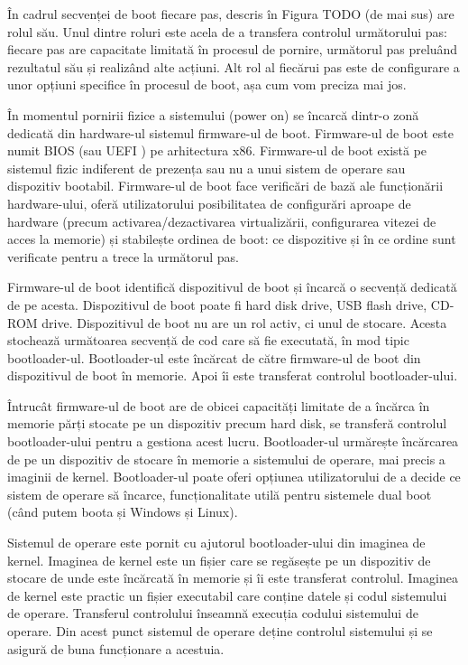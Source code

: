 În cadrul secvenței de boot fiecare pas, descris în Figura TODO (de mai sus) are
rolul său. Unul dintre roluri este acela de a transfera controlul următorului
pas: fiecare pas are capacitate limitată în procesul de pornire, următorul pas
preluând rezultatul său și realizând alte acțiuni. Alt rol al fiecărui pas este
de configurare a unor opțiuni specifice în procesul de boot, așa cum vom preciza
mai jos.

În momentul pornirii fizice a sistemului (power on) se încarcă dintr-o zonă
dedicată din hardware-ul sistemul firmware-ul de boot. Firmware-ul de boot este
numit BIOS (sau UEFI ) pe
arhitectura x86. Firmware-ul de boot există pe sistemul fizic indiferent de
prezența sau nu a unui sistem de operare sau dispozitiv bootabil. Firmware-ul de
boot face verificări de bază ale funcționării hardware-ului, oferă
utilizatorului posibilitatea de configurări aproape de hardware (precum
activarea/dezactivarea virtualizării, configurarea vitezei de acces la memorie)
și stabilește ordinea de boot: ce dispozitive și în ce ordine sunt verificate
pentru a trece la următorul pas.

Firmware-ul de boot identifică dispozitivul de boot și încarcă o secvență
dedicată de pe acesta. Dispozitivul de boot poate fi hard disk drive, USB flash
drive, CD-ROM drive. Dispozitivul de boot nu are un rol activ, ci unul de
stocare. Acesta stochează următoarea secvență de cod care să fie executată, în
mod tipic bootloader-ul. Bootloader-ul este încărcat de către firmware-ul de
boot din dispozitivul de boot în memorie. Apoi îi este transferat controlul
bootloader-ului.

Întrucât firmware-ul de boot are de obicei capacități limitate de a încărca în
memorie părți stocate pe un dispozitiv precum hard disk, se transferă controlul
bootloader-ului pentru a gestiona acest lucru. Bootloader-ul urmărește
încărcarea de pe un dispozitiv de stocare în memorie a sistemului de operare,
mai precis a imaginii de kernel. Bootloader-ul poate oferi opțiunea
utilizatorului de a decide ce sistem de operare să încarce, funcționalitate
utilă pentru sistemele dual boot (când putem boota și Windows și Linux).

Sistemul de operare este pornit cu ajutorul bootloader-ului din imaginea de
kernel. Imaginea de kernel este un fișier care se regăsește pe un dispozitiv de
stocare de unde este încărcată în memorie și îi este transferat controlul.
Imaginea de kernel este practic un fișier executabil care conține datele și
codul sistemului de operare. Transferul controlului înseamnă execuția codului
sistemului de operare. Din acest punct sistemul de operare deține controlul
sistemului și se asigură de buna funcționare a acestuia.


